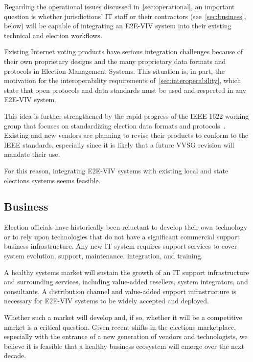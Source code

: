 Regarding the operational issues discussed
in~\autoref{sec:operational}, an important question is whether
jurisdictions' IT staff or their contractors
(see~\autoref{sec:business}, below) will be capable of integrating an
E2E-VIV system into their existing technical and election workflows.

Existing Internet voting products have serious integration challenges
because of their own proprietary designs and the many proprietary data
formats and protocols in Election Management Systems.  This situation
is, in part, the motivation for the interoperability requirements
of~\autoref{sec:interoperability}, which state that open protocols and
data standards must be used and respected in any E2E-VIV system.

This idea is further strengthened by the rapid progress of the IEEE
1622 working group that focuses on standardizing election data formats
and protocols~\cite{IEEE1622}. Existing and new vendors are planning
to revise their products to conform to the IEEE standards, especially
since it is likely that a future VVSG revision will mandate their use.

For this reason, integrating E2E-VIV systems with existing local and
state elections systems seems feasible.

\subsection{Business}
\label{sec:business}

Election officials have historically been reluctant to develop their
own technology or to rely upon technologies that do not have a
significant commercial support business infrastructure. Any new IT
system requires support services to cover system evolution, support,
maintenance, integration, and training.

A healthy systems market will sustain the growth of an IT support
infrastructure and surrounding services, including value-added
resellers, system integrators, and consultants. A distribution channel
and value-added support infrastructure is necessary for E2E-VIV
systems to be widely accepted and deployed.

Whether such a market will develop and, if so, whether it will be a
competitive market is a critical question. Given recent shifts in the
elections marketplace, especially with the entrance of a new
generation of vendors and technologists, we believe it is feasible
that a healthy business ecosystem will emerge over the next decade.

